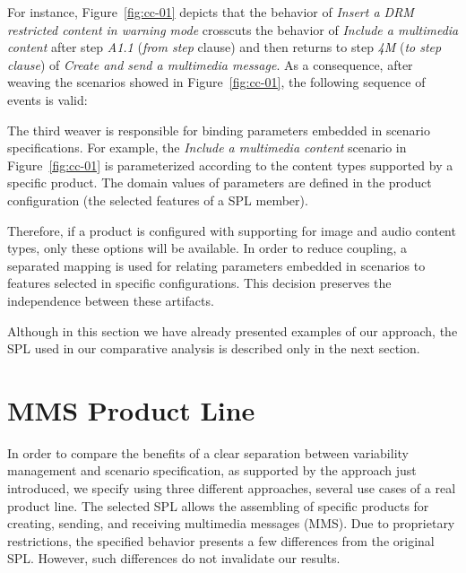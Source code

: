 \documentclass{acm_proc_article-sp}
\begin{document}
For instance, Figure~\ref{fig:cc-01} depicts that the behavior of \emph{Insert a DRM restricted content in warning mode} crosscuts the behavior of \emph{Include a multimedia content} after step \emph{A1.1} (\emph{from step} clause) and then returns to step \emph{4M} (\emph{to step clause}) of \emph{Create and send a multimedia message}.  As a consequence, after weaving the scenarios showed in Figure~\ref{fig:cc-01}, the following sequence of events is valid:

\begin{center}
\small{
}
\end{center}

The third weaver is responsible for binding parameters embedded in scenario specifications. For example, the \emph{Include a multimedia content} scenario in Figure~\ref{fig:cc-01} is parameterized according to the content types supported by a specific product. The domain values of parameters are defined in the product configuration (the selected features of a SPL member). 

Therefore, if a product is configured with supporting for image and audio content types, only these options will be available.  In order to reduce coupling, a separated mapping is used for relating parameters embedded in scenarios to features selected in specific configurations. This decision preserves the independence between these artifacts.

Although in this section we have already presented examples of our approach, the SPL used in our comparative analysis is described only in the next section. 


\section{MMS Product Line}
\label{sec:mms-pl}

In order to compare the benefits of a clear separation between variability management and scenario specification, as supported by the approach just introduced, we specify using three different approaches, several use cases of a real product line. The selected SPL allows the assembling of specific products for creating, sending, and receiving multimedia messages (MMS). Due to proprietary restrictions, the specified behavior presents a few differences from the original SPL. However, such differences do not invalidate our results.
\end{document}
